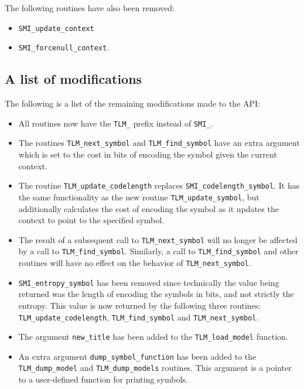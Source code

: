 \documentclass[11pt]{article}
\begin{document}
\noindent
The following routines have also been removed:

\begin{itemize}
\item \verb|SMI_update_context|
\item \verb|SMI_forcenull_context|.
\end{itemize}

\subsection{A list of modifications}

The following is a list of the remaining modifications made to the API:

\begin{itemize}
\item
All routines now have the \verb|TLM_| prefix instead of \verb|SMI_|.
 
\item
The routines \verb|TLM_next_symbol| and \verb|TLM_find_symbol| have an extra argument which
is set to the cost in bits of encoding the symbol given the current context.

\item
The routine \verb|TLM_update_codelength| replaces \verb|SMI_codelength_symbol|.
It has the same functionality as the new routine \verb|TLM_update_symbol|, but additionally calculates
the cost of encoding the symbol as it updates the context to point to
the specified symbol.

\item
The result of a subsequent call to \verb|TLM_next_symbol| will no longer
be affected by a call to \verb|TLM_find_symbol|. Similarly, a call to
\verb|TLM_find_symbol| and other routines will have no effect on the behavior of \verb|TLM_next_symbol|.

\item
\verb|SMI_entropy_symbol| has been removed since technically the value
being returned was the length of encoding the symbols in bits, and not strictly the entropy.
This value is now returned by the following three routines:
\verb|TLM_update_codelength|, \verb|TLM_find_symbol| and \verb|TLM_next_symbol|.

\item The argument \verb|new_title| has been added to the \verb|TLM_load_model| function.

\item An extra argument \verb|dump_symbol_function| has been added to the \verb|TLM_dump_model| and
\verb|TLM_dump_models| routines. This argument is a pointer to a user-defined function for printing symbols.

\end{itemize}
\end{document}
